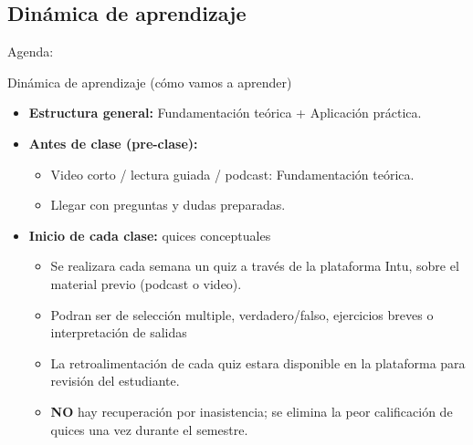 \documentclass[10pt, xcolor=dvipsnames]{beamer}
\begin{document}
\subsection{Dinámica de aprendizaje}
\begin{frame}[noframenumbering]{Agenda:}
\end{frame}

\begin{frame}{Dinámica de aprendizaje (cómo vamos a aprender)}
\small
\begin{itemize}
  \item \textbf{Estructura general:} Fundamentación teórica + Aplicación práctica. \vspace{0.15cm}

  \item \textbf{Antes de clase (pre-clase):} 
  \begin{itemize}
    \item Video corto / lectura guiada / podcast: Fundamentación teórica.
    \item Llegar con preguntas y dudas preparadas.
  \end{itemize} \vspace{0.15cm}

  \item \textbf{Inicio de cada clase:} quices conceptuales
  \begin{itemize}
    \item Se realizara cada semana un quiz a través de la plataforma Intu, sobre el material previo (podcast o video).
    \item Podran ser de selección multiple, verdadero/falso, ejercicios breves o interpretación de salidas
    \item La retroalimentación de cada quiz estara disponible en la plataforma para revisión del estudiante.
    \item \textbf{NO} hay recuperación por inasistencia; se elimina la peor calificación de quices una vez durante el semestre.
  \end{itemize} \vspace{0.15cm}
\end{itemize}
\end{frame}
\end{document}
